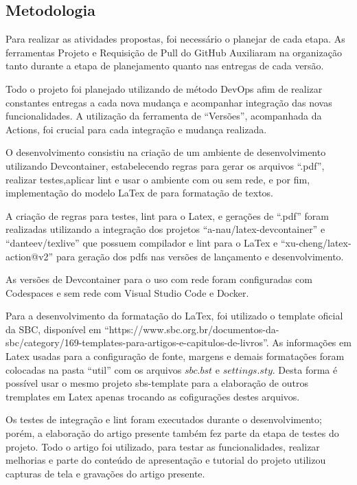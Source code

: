 \subsection{Metodologia}

Para realizar as atividades propostas, foi necessário o planejar de cada etapa. As ferramentas Projeto e Requisição de Pull do GitHub Auxiliaram na organização tanto durante a etapa de planejamento quanto nas entregas de cada versão.

Todo o projeto foi planejado utilizando de método DevOps afim de realizar constantes entregas a cada nova mudança e acompanhar integração das novas funcionalidades. A utilização da ferramenta de ``Versões'', acompanhada da Actions, foi crucial para cada integração e mudança realizada.

O desenvolvimento consistiu na criação de um ambiente de desenvolvimento utilizando Devcontainer, estabelecendo regras para gerar os arquivos ``.pdf'', realizar testes,aplicar lint e usar o ambiente com ou sem rede, e por fim, implementação do modelo LaTex de para formatação de textos.


A criação de regras para testes, lint para o Latex, e gerações de ``.pdf'' foram realizadas utilizando a integração dos projetos ``a-nau/latex-devcontainer'' e ``danteev/texlive'' que possuem compilador e lint para o LaTex e ``xu-cheng/latex-action@v2'' para geração dos pdfs nas versões de lançamento e desenvolvimento.

As versões de Devcontainer para o uso com rede foram configuradas com Codespaces e sem rede com Visual Studio Code e Docker.

Para a desenvolvimento da formatação do LaTex, foi utilizado o template oficial da SBC, disponível em ``https://www.sbc.org.br/documentos-da-sbc/category/169-templates-para-artigos-e-capitulos-de-livros''. As informações em Latex usadas para a configuração de fonte, margens e demais formatações foram colocadas na pasta ``util'' com os arquivos $sbc.bst$ e $settings.sty$. Desta forma é possível usar o mesmo projeto sbs-template para a elaboração de outros tremplates em Latex apenas trocando as cofigurações destes arquivos.

Os testes de integração e lint foram executados durante o desenvolvimento; porém, a elaboração do artigo presente também fez parte da etapa de testes do projeto. Todo o artigo foi utilizado, para testar as funcionalidades, realizar melhorias e parte do conteúdo de apresentação e tutorial do projeto utilizou capturas de tela e gravações do artigo presente.